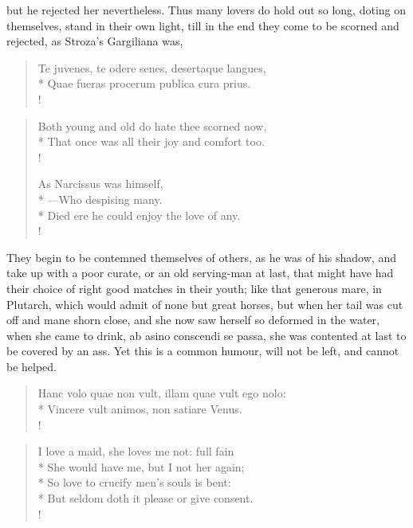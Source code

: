 but he rejected her nevertheless. Thus many lovers do hold out so long,
doting on themselves, stand in their own light, till in the end they
come to be scorned and rejected, as Stroza's Gargiliana was,

\begin{latin}
\begin{verse}%
Te juvenes, te odere senes, desertaque langues,\\*
Quae fueras procerum publica cura prius.\\!
\end{verse}%
\end{latin}

\begin{verse}%
Both young and old do hate thee scorned now,\\*
That once was all their joy and comfort too.\\!

As Narcissus was himself,\\*
---Who despising many.\\*
Died ere he could enjoy the love of any.\\!
\end{verse}%

They begin to be contemned themselves of others, as he was of his
shadow, and take up with a poor curate, or an old serving-man at last,
that might have had their choice of right good matches in their youth;
like that generous mare, in Plutarch, which would admit of none
but great horses, but when her tail was cut off and mane shorn close,
and she now saw herself so deformed in the water, when she came to
drink, ab asino conscendi se passa, she was contented at last to be
covered by an ass. Yet this is a common humour, will not be left, and
cannot be helped.

\begin{latin}
\begin{verse}%
Hanc volo quae non vult, illam quae vult ego nolo:\\*
Vincere vult animos, non satiare Venus.\\!
\end{verse}%
\end{latin}
\translationrule%
\begin{verse}%
I love a maid, she loves me not: full fain\\*
She would have me, but I not her again;\\*
So love to crucify men's souls is bent:\\*
But seldom doth it please or give consent.\\!
\end{verse}%
%

